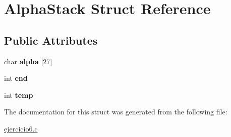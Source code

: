 \hypertarget{structAlphaStack}{}\section{Alpha\+Stack Struct Reference}
\label{structAlphaStack}
\subsection*{Public Attributes}
\begin{DoxyCompactItemize}
\item 
char {\bfseries alpha} \mbox{[}27\mbox{]}\hypertarget{structAlphaStack_a6c59a919dabcebcbf1ae4ccef9337135}{}\label{structAlphaStack_a6c59a919dabcebcbf1ae4ccef9337135}

\item 
int {\bfseries end}\hypertarget{structAlphaStack_a017433d014baa803841113a44d21ecb4}{}\label{structAlphaStack_a017433d014baa803841113a44d21ecb4}

\item 
int {\bfseries temp}\hypertarget{structAlphaStack_a2830c5350dd383f7a10a37f06d3c2c82}{}\label{structAlphaStack_a2830c5350dd383f7a10a37f06d3c2c82}

\end{DoxyCompactItemize}


The documentation for this struct was generated from the following file\+:\begin{DoxyCompactItemize}
\item 
\hyperlink{ejercicio6_8c}{ejercicio6.\+c}\end{DoxyCompactItemize}
